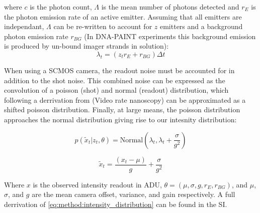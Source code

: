 where $c$ is the photon count, $\Lambda$ is the mean number of photons detected 
and $r_{E}$ is the photon emission rate of an active emitter.
%
Assuming that all emitters are independant, $\Lambda$ can be re-written 
to account for $z$ emitters and a background photon emission rate 
$r_{BG}$ (In DNA-PAINT experiments this background emission is produced 
by un-bound imager strands in solution):
%
\begin{equation*}
	\lambda_{t} = (z_{t} r_{E} + r_{BG})\Delta t
\end{equation*}

When using a SCMOS camera, the readout noise must be accounted for in addition to the shot noise. 
This combined noise can be expressed as the convolution of a poisson (shot) and normal (readout) distribution,
which following a derrivation from (Video rate nanoscopy) can be approximated as a shifted poisson distribution.
Finally, at large means, the poisson distribution approaches the normal distribution giving rise to our intesnity distribution:

\begin{equation}
  p(\tilde{x}_{t}| z_{t}, \theta) = \text{Normal} \left(\lambda_{t}, \lambda_{t} + \frac{\sigma}{g^{2}} \right)
  \label{eq:method:intensity_distribution}
\end{equation}

\begin{equation*}
  \tilde{x}_{t} = \frac{(x_{t} - \mu)}{g} + \frac{\sigma}{g^{2}}
\end{equation*}


Where $x$ is the observed intensity readout in ADU, 
$\theta = (\mu, \sigma, g, r_{E}, r_{BG})$, and $\mu$, $\sigma$,
and $g$ are the mean camera offset, variance, and gain respectively.
%
A full derrivation of \eqref{eq:method:intensity_distribution} can be found in the SI.


